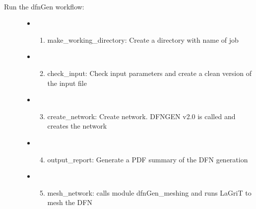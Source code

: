 \documentclass[letterpaper,10pt,english]{sphinxmanual}
\begin{document}
\begin{fulllineitems}
\label{\detokenize{pydfnworks:pydfnworks.generator.dfn_gen}}~\begin{description}
\item[{Run the dfnGen workflow: }] \leavevmode\begin{itemize}
\item {} \begin{enumerate}
\item {} 
make\_working\_directory: Create a directory with name of job

\end{enumerate}

\item {} \begin{enumerate}
\setcounter{enumi}{1}
\item {} 
check\_input: Check input parameters and create a clean version of the input file

\end{enumerate}

\item {} \begin{enumerate}
\setcounter{enumi}{2}
\item {} 
create\_network: Create network. DFNGEN v2.0 is called and creates the network

\end{enumerate}

\item {} \begin{enumerate}
\setcounter{enumi}{3}
\item {} 
output\_report: Generate a PDF summary of the DFN generation

\end{enumerate}

\item {} \begin{enumerate}
\setcounter{enumi}{4}
\item {} 
mesh\_network: calls module dfnGen\_meshing and runs LaGriT to mesh the DFN

\end{enumerate}

\end{itemize}

\end{description}

\end{fulllineitems}
\end{document}
